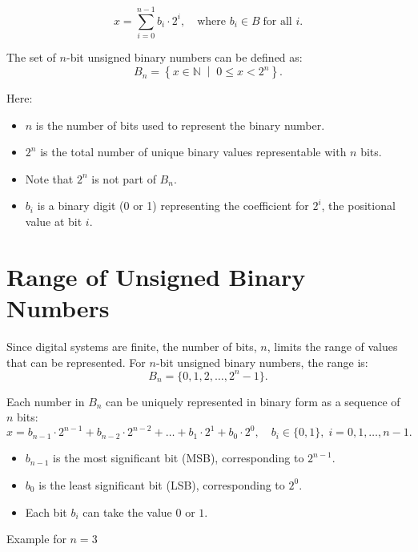 \[
x = \sum_{i=0}^{n-1} b_i \cdot 2^i, \quad \text{where } b_i \in B \; \text{for all } i.
\]

The set of \( n \)-bit unsigned binary numbers can be defined as:
\[
B_n = \left\{ x \in \mathbb{N} \; \middle| \; 0 \leq x < 2^n \right\}.
\]

Here:
\begin{itemize}
    \item \( n \) is the number of bits used to represent the binary number.
    \item \( 2^n \) is the total number of unique binary values representable with \( n \) bits.
    \item Note that \( 2^n \) is not part of \( B_n\).
    \item \( b_i \) is a binary digit (0 or 1) representing the coefficient for \( 2^i \), the positional value at bit \( i \).
\end{itemize}




\section{Range of Unsigned Binary Numbers}

Since digital systems are finite, the number of bits, \( n \), limits the range of values that can be represented. For \( n \)-bit unsigned binary numbers, the range is:
\[
B_n = \{0, 1, 2, \dots, 2^n - 1\}.
\]

Each number in \( B_n \) can be uniquely represented in binary form as a sequence of \( n \) bits:
\[
x = b_{n-1} \cdot 2^{n-1} + b_{n-2} \cdot 2^{n-2} + \dots + b_1 \cdot 2^1 + b_0 \cdot 2^0, \quad b_i \in \{0, 1\}, \; i = 0, 1, \dots, n-1.
\]

\begin{itemize}
    \item \( b_{n-1} \) is the most significant bit (MSB), corresponding to \( 2^{n-1} \).
    \item \( b_0 \) is the least significant bit (LSB), corresponding to \( 2^0 \).
    \item Each bit \( b_i \) can take the value \( 0 \) or \( 1 \).
\end{itemize}

Example for \( n = 3 \)

